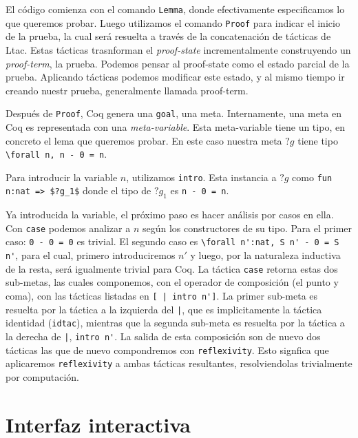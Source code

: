 El código comienza con el comando \lstinline{Lemma}, donde efectivamente especificamos lo que queremos probar.
Luego utilizamos el comando \lstinline{Proof} para indicar el inicio de la prueba, la cual será resuelta a través de la concatenación de tácticas de Ltac. Estas tácticas trasnforman el \textit{proof-state} incrementalmente construyendo un \textit{proof-term}, la prueba. Podemos pensar al proof-state como el estado parcial de la prueba. Aplicando tácticas podemos modificar este estado, y al mismo tiempo ir creando nuestr prueba, generalmente llamada proof-term.

Después de \lstinline{Proof}, Coq genera una \lstinline{goal}, una meta. Internamente, una meta en Coq es representada con una \textit{meta-variable}. Esta meta-variable tiene un tipo, en concreto el lema que queremos probar. En este caso nuestra meta $?g$ tiene tipo \lstinline{\forall n, n - 0 = n}.

Para introducir la variable $n$, utilizamos \lstinline{intro}. Esta instancia a $?g$ como \lstinline{fun n:nat => $?g_1$} donde el tipo de $?g_1$ es \lstinline{n - 0 = n}.

Ya introducida la variable, el próximo paso es hacer análisis por casos en ella. Con \lstinline{case} podemos analizar a $n$ según los constructores de su tipo. Para el primer caso: \lstinline{0 - 0 = 0} es trivial. El segundo caso es \lstinline{\forall n':nat, S n' - 0 = S n'}, para el cual, primero introduciremos $n'$ y luego, por la naturaleza inductiva de la resta, será igualmente trivial para Coq. La táctica \lstinline{case} retorna estas dos sub-metas, las cuales componemos, con el operador de composición (el punto y coma), con las tácticas listadas en \lstinline{[ | intro n']}. La primer sub-meta es resuelta por la táctica a la izquierda del \lstinline{|}, que es implicitamente la táctica identidad (\lstinline{idtac}), mientras que la segunda sub-meta es resuelta por la táctica a la derecha de \lstinline{|}, \lstinline{intro n'}. La salida de esta composición son de nuevo dos tácticas las que de nuevo compondremos con \lstinline{reflexivity}. Esto signfica que aplicaremos \lstinline{reflexivity} a ambas tácticas resultantes, resolviendolas trivialmente por computación.

\section{Interfaz interactiva}

